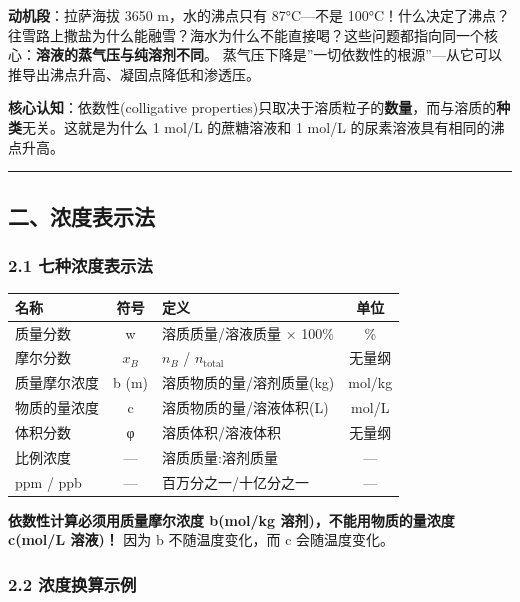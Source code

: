\documentclass[a4paper,11pt]{ctexart}
\newcounter{none}
\newcommand{\箭}{\ensuremath{\rightarrow}}
\newcommand{\左箭}{\ensuremath{\leftarrow}}
\newcommand{\上箭}{\ensuremath{\uparrow}}
\newcommand{\下箭}{\ensuremath{\downarrow}}
\newcommand{\衡}{\ensuremath{\rightleftharpoons}}
\newcommand{\双箭}{\ensuremath{\leftrightarrow}}
\newcommand{\约等于}{\ensuremath{\approx}}
\newcommand{\小于等于}{\ensuremath{\leq}}
\newcommand{\大于等于}{\ensuremath{\geq}}
\newcommand{\不等于}{\ensuremath{\neq}}
\newcommand{\西格马}{\ensuremath{\sigma}}
\newcommand{\派}{\ensuremath{\pi}}
\begin{document}
\textbf{动机段}：拉萨海拔 3650 m，水的沸点只有 87°C---不是 100°C！什么决定了沸点？往雪路上撒盐为什么能融雪？海水为什么不能直接喝？这些问题都指向同一个核心：\textbf{溶液的蒸气压与纯溶剂不同}。
蒸气压下降是''一切依数性的根源''---从它可以推导出沸点升高、凝固点降低和渗透压。

\textbf{核心认知}：依数性(colligative properties)只取决于溶质粒子的\textbf{数量}，而与溶质的\textbf{种类}无关。这就是为什么 1 mol/L 的蔗糖溶液和 1 mol/L 的尿素溶液具有相同的沸点升高。

\begin{center}\rule{0.5\linewidth}{0.5pt}\end{center}

\subsection{二、浓度表示法}\label{ux4e8cux6d53ux5ea6ux8868ux793aux6cd5}

\subsubsection{2.1 七种浓度表示法}\label{ux4e03ux79cdux6d53ux5ea6ux8868ux793aux6cd5}

{\def\LTcaptype{none} %
\begin{longtable}[]{@{}lclc@{}}
\toprule\noalign{}
名称 & 符号 & 定义 & 单位 \\
\midrule\noalign{}
\endhead
\bottomrule\noalign{}
\endlastfoot
质量分数 & w & 溶质质量/溶液质量 × 100\% & \% \\
摩尔分数 & \(x_B\) & \(n_B\) / \(n_{\text{total}}\) & 无量纲 \\
质量摩尔浓度 & b (m) & 溶质物质的量/溶剂质量(kg) & mol/kg \\
物质的量浓度 & c & 溶质物质的量/溶液体积(L) & mol/L \\
体积分数 & φ & 溶质体积/溶液体积 & 无量纲 \\
比例浓度 & --- & 溶质质量:溶剂质量 & --- \\
ppm / ppb & --- & 百万分之一/十亿分之一 & --- \\
\end{longtable}
}

\textbf{依数性计算必须用质量摩尔浓度 b(mol/kg 溶剂)，不能用物质的量浓度 c(mol/L 溶液)！} 因为 b 不随温度变化，而 c 会随温度变化。

\subsubsection{2.2 浓度换算示例}\label{ux6d53ux5ea6ux6362ux7b97ux793aux4f8b}
\end{document}
